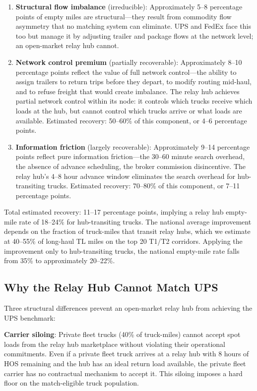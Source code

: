 \begin{enumerate}
  \item \textbf{Structural flow imbalance} (irreducible): Approximately 5--8 percentage points of empty miles are structural---they result from commodity flow asymmetry that no matching system can eliminate. UPS and FedEx face this too but manage it by adjusting trailer and package flows at the network level; an open-market relay hub cannot.

  \item \textbf{Network control premium} (partially recoverable): Approximately 8--10 percentage points reflect the value of full network control---the ability to assign trailers to return trips before they depart, to modify routing mid-haul, and to refuse freight that would create imbalance. The relay hub achieves partial network control within its node: it controls which trucks receive which loads at the hub, but cannot control which trucks arrive or what loads are available. Estimated recovery: 50--60\% of this component, or 4--6 percentage points.

  \item \textbf{Information friction} (largely recoverable): Approximately 9--14 percentage points reflect pure information friction---the 30--60 minute search overhead, the absence of advance scheduling, the broker commission disincentive. The relay hub's 4--8 hour advance window eliminates the search overhead for hub-transiting trucks. Estimated recovery: 70--80\% of this component, or 7--11 percentage points.
\end{enumerate}

Total estimated recovery: 11--17 percentage points, implying a relay hub empty-mile rate of 18--24\% for hub-transiting trucks. The national average improvement depends on the fraction of truck-miles that transit relay hubs, which we estimate at 40--55\% of long-haul TL miles on the top 20 T1/T2 corridors. Applying the improvement only to hub-transiting trucks, the national empty-mile rate falls from 35\% to approximately 20--22\%.

\subsection{Why the Relay Hub Cannot Match UPS}

Three structural differences prevent an open-market relay hub from achieving the UPS benchmark:

\textbf{Carrier siloing}: Private fleet trucks (40\% of truck-miles) cannot accept spot loads from the relay hub marketplace without violating their operational commitments. Even if a private fleet truck arrives at a relay hub with 8 hours of HOS remaining and the hub has an ideal return load available, the private fleet carrier has no contractual mechanism to accept it. This siloing imposes a hard floor on the match-eligible truck population.

